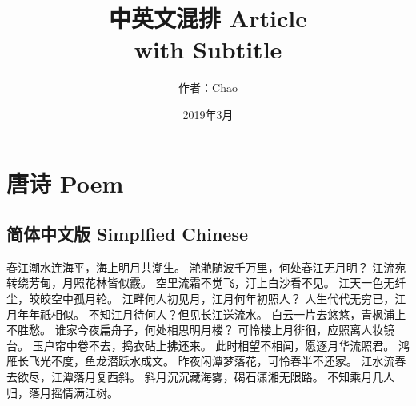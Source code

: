 \documentclass[a4paper]{article}
\title{
    中英文混排 Article \\
    \large with Subtitle
}
\author{作者：Chao}
\date{2019年3月}
\begin{document}
\maketitle
\newpage
\tableofcontents
\newpage
\section{唐诗 Poem}
    \subsection{简体中文版 Simplfied Chinese}
        \begin{center}
            春江潮水连海平，海上明月共潮生。\newline
            滟滟随波千万里，何处春江无月明？\newline
            江流宛转绕芳甸，月照花林皆似霰。\newline
            空里流霜不觉飞，汀上白沙看不见。\newline
            江天一色无纤尘，皎皎空中孤月轮。\newline
            江畔何人初见月，江月何年初照人？\newline
            人生代代无穷已，江月年年祇相似。\newline
            不知江月待何人？但见长江送流水。\newline
            白云一片去悠悠，青枫浦上不胜愁。\newline
            谁家今夜扁舟子，何处相思明月楼？\newline
            可怜楼上月徘徊，应照离人妆镜台。\newline
            玉户帘中卷不去，捣衣砧上拂还来。\newline
            此时相望不相闻，愿逐月华流照君。\newline
            鸿雁长飞光不度，鱼龙潜跃水成文。\newline
            昨夜闲潭梦落花，可怜春半不还家。\newline
            江水流春去欲尽，江潭落月复西斜。\newline
            斜月沉沉藏海雾，碣石潇湘无限路。\newline
            不知乘月几人归，落月摇情满江树。\newline
        \end{center}
\end{document}
